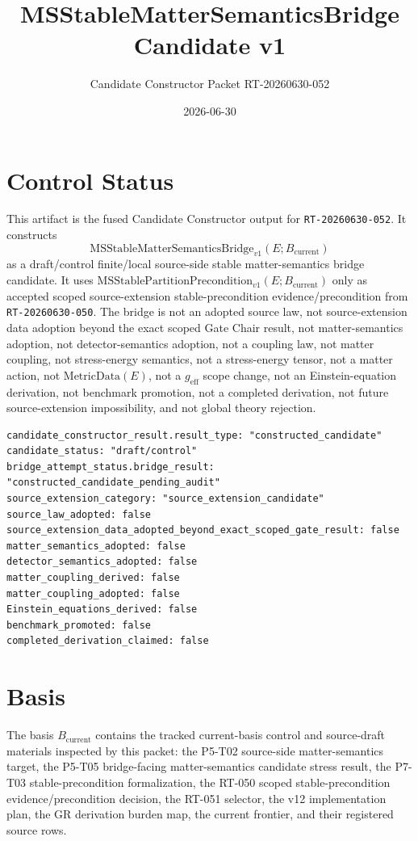 \documentclass[11pt]{article}
\title{MSStableMatterSemanticsBridge Candidate v1}
\author{Candidate Constructor Packet RT-20260630-052}
\date{2026-06-30}
\newcommand{\Bcur}{B_{\mathrm{current}}}
\newcommand{\MSStablePre}{\mathrm{MSStablePartitionPrecondition}_{v1}}
\newcommand{\MSBridge}{\mathrm{MSStableMatterSemanticsBridge}_{v1}}
\newcommand{\MetricData}{\mathrm{MetricData}}
\newcommand{\geff}{g_{\mathrm{eff}}}
\begin{document}
\maketitle

\section{Control Status}

This artifact is the fused Candidate Constructor output for
\texttt{RT-20260630-052}. It constructs
\[
  \MSBridge(E;\Bcur)
\]
as a draft/control finite/local source-side stable matter-semantics bridge
candidate. It uses \(\MSStablePre(E;\Bcur)\) only as accepted scoped
source-extension stable-precondition evidence/precondition from
\texttt{RT-20260630-050}. The bridge is not an adopted source law, not
source-extension data adoption beyond the exact scoped Gate Chair result, not
matter-semantics adoption, not detector-semantics adoption, not a coupling
law, not matter coupling, not stress-energy semantics, not a stress-energy
tensor, not a matter action, not \(\MetricData(E)\), not a \(\geff\) scope
change, not an Einstein-equation derivation, not benchmark promotion, not a
completed derivation, not future source-extension impossibility, and not
global theory rejection.

\begin{verbatim}
candidate_constructor_result.result_type: "constructed_candidate"
candidate_status: "draft/control"
bridge_attempt_status.bridge_result: "constructed_candidate_pending_audit"
source_extension_category: "source_extension_candidate"
source_law_adopted: false
source_extension_data_adopted_beyond_exact_scoped_gate_result: false
matter_semantics_adopted: false
detector_semantics_adopted: false
matter_coupling_derived: false
matter_coupling_adopted: false
Einstein_equations_derived: false
benchmark_promoted: false
completed_derivation_claimed: false
\end{verbatim}

\section{Basis}

The basis \(\Bcur\) contains the tracked current-basis control and
source-draft materials inspected by this packet: the P5-T02 source-side
matter-semantics target, the P5-T05 bridge-facing matter-semantics candidate
stress result, the P7-T03 stable-precondition formalization, the RT-050
scoped stable-precondition evidence/precondition decision, the RT-051
selector, the v12 implementation plan, the GR derivation burden map, the
current frontier, and their registered source rows.
\end{document}
